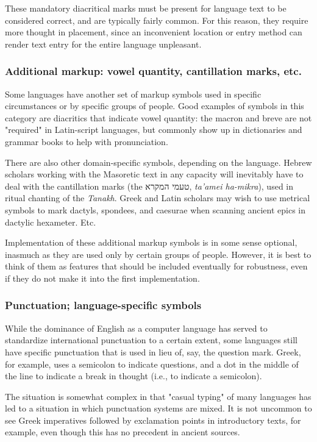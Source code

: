 \documentclass[11pt]{article}
\begin{document}
These mandatory diacritical marks must be present for language text to be considered correct, and are typically fairly common. For this reason, they require more thought in placement, since an inconvenient location or entry method can render text entry for the entire language unpleasant.

\subsubsection{Additional markup: vowel quantity, cantillation marks, etc.}
\label{sec:org892de33}

Some languages have another set of markup symbols used in specific circumstances or by specific groups of people. Good examples of symbols in this category are diacritics that indicate vowel quantity: the macron and breve are not "required" in Latin-script languages, but commonly show up in dictionaries and grammar books to help with pronunciation.

There are also other domain-specific symbols, depending on the language. Hebrew scholars working with the Masoretic text in any capacity will inevitably have to deal with the cantillation marks (the \texthebrew{טעמי המקרא}, \emph{ta'amei ha-mikra}), used in ritual chanting of the \emph{Tanakh}. Greek and Latin scholars may wish to use metrical symbols to mark dactyls, spondees, and caesurae when scanning ancient epics in dactylic hexameter. Etc.

Implementation of these additional markup symbols is in some sense optional, inasmuch as they are used only by certain groups of people. However, it is best to think of them as features that should be included eventually for robustness, even if they do not make it into the first implementation.

\subsubsection{Punctuation; language-specific symbols}
\label{sec:org6200877}

While the dominance of English as a computer language has served to standardize international punctuation to a certain extent, some languages still have specific punctuation that is used in lieu of, say, the question mark. Greek, for example, uses a semicolon to indicate questions, and a dot in the middle of the line to indicate a break in thought (i.e., to indicate a semicolon).

The situation is somewhat complex in that "casual typing" of many languages has led to a situation in which punctuation systems are mixed. It is not uncommon to see Greek imperatives followed by exclamation points in introductory texts, for example, even though this has no precedent in ancient sources.
\end{document}
